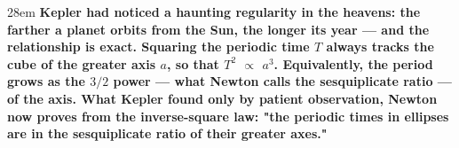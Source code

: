 \documentclass[border=4pt]{standalone}
\begin{document}
\begin{varwidth}{28em}
\large\bfseries
Kepler had noticed a haunting regularity in the heavens: the farther a planet      orbits from the Sun, the longer its year — and the relationship is exact. Squaring      \textcolor{timeblue}{the periodic time $T$} always tracks \textcolor{axisorange}{the cube of the greater axis $a$},      so that \textcolor{timeblue}{$T^2$} $\propto$ \textcolor{axisorange}{$a^3$}. Equivalently, \textcolor{timeblue}{the period}      grows as \textcolor{ratiopurple}{the $3/2$ power} — what Newton calls the \textcolor{ratiopurple}{sesquiplicate ratio} —      of the axis. What Kepler found only by patient observation, Newton now \textcolor{axisorange}{proves} from      the inverse-square law: "the periodic times in ellipses are in the sesquiplicate ratio of their greater axes."
\end{varwidth}
\end{document}
